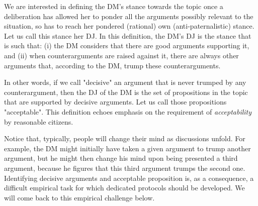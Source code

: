 \documentclass[version=3.21, pagesize, twoside=off, bibliography=totoc, DIV=calc, fontsize=12pt, a4paper, french, english]{scrartcl}
\begin{document}
We are interested in defining the \ac{DM}’s stance towards the topic once a deliberation has allowed her to ponder all the arguments possibly relevant to the situation, so has to reach her pondered (rational) own (anti-paternalistic) stance. Let us call this stance her \ac{DJ}. In this definition, the \ac{DM}’s \ac{DJ} is the stance that is such that: (i) the \ac{DM} considers that there are good arguments supporting it, and (ii) when counterarguments are raised against it, there are always other arguments that, according to the \ac{DM}, trump these counterarguments.

In other words, if we call "decisive" an argument that is never trumped by any counterargument, then the \ac{DJ} of the \ac{DM} is the set of propositions in the topic that are supported by decisive arguments. Let us call those propositions "acceptable". This definition echoes  emphasis on the requirement of \emph{acceptability} by reasonable citizens. 


Notice that, typically, people will change their mind as discussions unfold. For example, the \ac{DM} might initially have taken a given argument to trump another argument, but he might then change his mind upon being presented a third argument, because he figures that this third argument trumps the second one. Identifying decisive arguments and acceptable proposition is, as a consequence, a difficult empirical task for which dedicated protocols should be developed. We will come back to this empirical challenge below.
\end{document}
